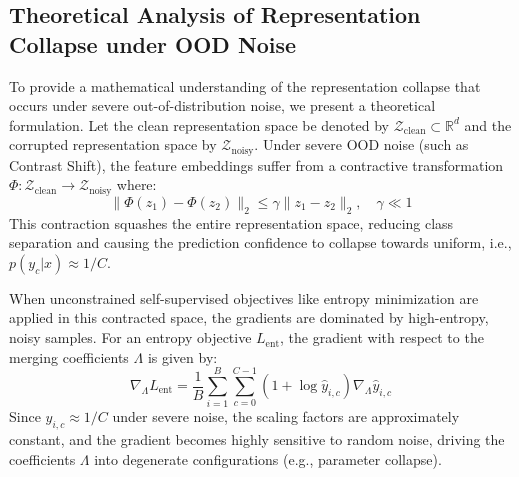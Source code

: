 \documentclass{article}
\theoremstyle{plain}
\theoremstyle{definition}
\theoremstyle{remark}
\begin{document}
\subsection{Theoretical Analysis of Representation Collapse under OOD Noise}
To provide a mathematical understanding of the representation collapse that occurs under severe out-of-distribution noise, we present a theoretical formulation. Let the clean representation space be denoted by $\mathcal{Z}_{\text{clean}} \subset \mathbb{R}^d$ and the corrupted representation space by $\mathcal{Z}_{\text{noisy}}$. Under severe OOD noise (such as Contrast Shift), the feature embeddings suffer from a contractive transformation $\Phi: \mathcal{Z}_{\text{clean}} \to \mathcal{Z}_{\text{noisy}}$ where:
\begin{equation}
    \|\Phi(z_1) - \Phi(z_2)\|_2 \le \gamma \|z_1 - z_2\|_2, \quad \gamma \ll 1
\end{equation}
This contraction squashes the entire representation space, reducing class separation and causing the prediction confidence to collapse towards uniform, i.e., $p(y_c|x) \approx 1/C$.

When unconstrained self-supervised objectives like entropy minimization are applied in this contracted space, the gradients are dominated by high-entropy, noisy samples. For an entropy objective $L_{\text{ent}}$, the gradient with respect to the merging coefficients $\Lambda$ is given by:
\begin{equation}
    \nabla_\Lambda L_{\text{ent}} = \frac{1}{B} \sum_{i=1}^B \sum_{c=0}^{C-1} (1 + \log \hat{y}_{i,c}) \nabla_\Lambda \hat{y}_{i,c}
\end{equation}
Since $\hat{y}_{i,c} \approx 1/C$ under severe noise, the scaling factors are approximately constant, and the gradient becomes highly sensitive to random noise, driving the coefficients $\Lambda$ into degenerate configurations (e.g., parameter collapse).
\end{document}
